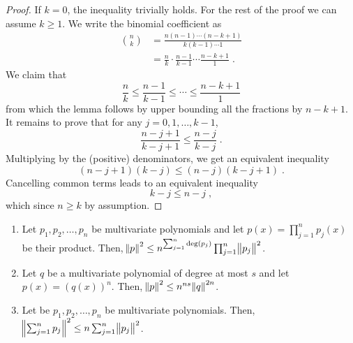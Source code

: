 \begin{proof}
If $k = 0$, the inequality trivially holds. For the rest of the proof we can
assume $k \ge 1$. We write the binomial coefficient as
\begin{align*}
\binom{n}{k}
& = \frac{n(n-1)\cdots(n-k+1)}{k(k-1) \cdots 1} \\
& = \frac{n}{k} \cdot \frac{n-1}{k - 1} \cdots \frac{n-k+1}{1} \; .
\end{align*}
We claim that
$$
\frac{n}{k} \le \frac{n-1}{k - 1} \le \cdots \le \frac{n-k+1}{1}
$$
from which the lemma follows by upper bounding all the fractions by $n-k+1$.
It remains to prove that for any $j=0,1,\dots,k-1$,
$$
\frac{n - j + 1}{k - j + 1} \le \frac{n - j}{k - j} \; .
$$
Multiplying by the (positive) denominators, we get an equivalent inequality
$$
(n - j + 1)(k - j) \le (n - j)(k - j + 1) \; .
$$
Cancelling common terms leads to an equivalent inequality
$$
k - j \le n - j \; ,
$$
which since $n \ge k$ by assumption.
\end{proof}

\begin{lemma}
\label{lemma:properties-of-norm-of-polynomials}
\hspace{1cm} %
\begin{enumerate}
\item Let $p_1, p_2, \dots, p_n$ be multivariate polynomials and let $p(x) =
\prod_{j=1}^n p_j(x)$ be their product.  Then, $\norm{p}^2 \le n^{\sum_{j=1}^n
\deg(p_j)} \prod_{j=1}^n \norm{p_j}^2$.

\item Let $q$ be a multivariate polynomial of degree at most $s$ and let $p(x) =
(q(x))^n$. Then, $\norm{p}^2 \le n^{ns} \norm{q}^{2n}$.

\item Let be $p_1, p_2, \dots, p_n$ be multivariate polynomials. Then,
$\norm{\sum_{j=1}^n p_j}^2 \le n \sum_{j=1}^n \norm{p_j}^2$.
\end{enumerate}
\end{lemma}

